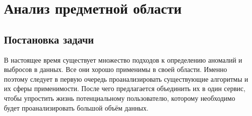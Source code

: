 \chapter{Анализ предметной области} \label{ch:ch1}

\section{Постановка задачи} \label{sec:ch1/sec1}

В настоящее время существует множество подходов к определению аномалий и выбросов в данных. Все они хорошо применимы в своей области. Именно поэтому следует в первую очередь проанализировать существующие алгоритмы и их сферы применимости. После чего предлагается объединить их в один сервис, чтобы упростить жизнь потенциальному пользователю, которому необходимо будет проанализировать большой объём данных.
